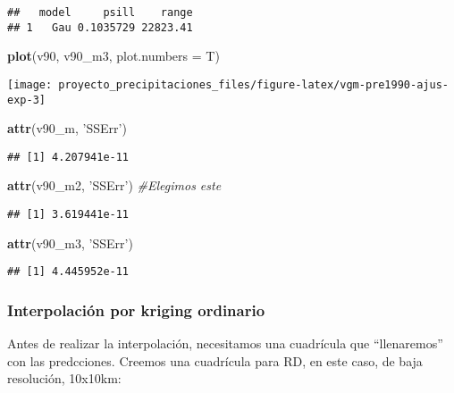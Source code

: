 \documentclass[11pt,]{article}
\newenvironment{Shaded}{\begin{snugshade}}{\end{snugshade}}
\newcommand{\KeywordTok}[1]{\textcolor[rgb]{0.13,0.29,0.53}{\textbf{#1}}}
\newcommand{\DataTypeTok}[1]{\textcolor[rgb]{0.13,0.29,0.53}{#1}}
\newcommand{\StringTok}[1]{\textcolor[rgb]{0.31,0.60,0.02}{#1}}
\newcommand{\CommentTok}[1]{\textcolor[rgb]{0.56,0.35,0.01}{\textit{#1}}}
\newcommand{\NormalTok}[1]{#1}
\begin{document}
\begin{verbatim}
##   model     psill    range
## 1   Gau 0.1035729 22823.41
\end{verbatim}

\begin{Shaded}
\begin{Highlighting}[]
\KeywordTok{plot}\NormalTok{(v90, v90_m3, }\DataTypeTok{plot.numbers =}\NormalTok{ T)}
\end{Highlighting}
\end{Shaded}

\texttt{[image: proyecto\_precipitaciones\_files/figure-latex/vgm-pre1990-ajus-exp-3]}

\begin{Shaded}
\begin{Highlighting}[]
\KeywordTok{attr}\NormalTok{(v90_m, }\StringTok{'SSErr'}\NormalTok{)}
\end{Highlighting}
\end{Shaded}

\begin{verbatim}
## [1] 4.207941e-11
\end{verbatim}

\begin{Shaded}
\begin{Highlighting}[]
\KeywordTok{attr}\NormalTok{(v90_m2, }\StringTok{'SSErr'}\NormalTok{) }\CommentTok{#Elegimos este}
\end{Highlighting}
\end{Shaded}

\begin{verbatim}
## [1] 3.619441e-11
\end{verbatim}

\begin{Shaded}
\begin{Highlighting}[]
\KeywordTok{attr}\NormalTok{(v90_m3, }\StringTok{'SSErr'}\NormalTok{)}
\end{Highlighting}
\end{Shaded}

\begin{verbatim}
## [1] 4.445952e-11
\end{verbatim}

\subsubsection{Interpolación por kriging
ordinario}\label{interpolaciuxf3n-por-kriging-ordinario}

Antes de realizar la interpolación, necesitamos una cuadrícula que
``llenaremos'' con las predcciones. Creemos una cuadrícula para RD, en
este caso, de baja resolución, 10x10km:
\end{document}
